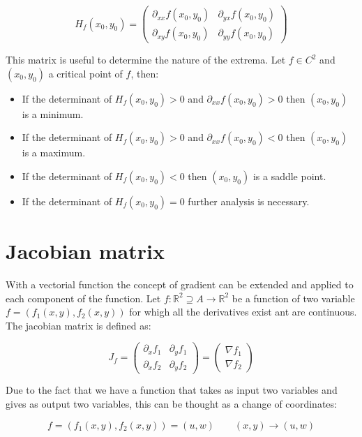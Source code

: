 $$H_f(x_0, y_0) = \begin{pmatrix} \partial_{xx} f(x_0, y_0) & \partial_{yx}f(x_0, y_0) \\ \partial_{xy} f(x_0, y_0) & \partial_{yy}f(x_0, y_0)\end{pmatrix}$$

This matrix is useful to determine the nature of the extrema.
Let $f\in C^2$ and $(x_0, y_0)$ a critical point of $f$, then:

\begin{multicols}{2}
	\begin{itemize}
		\item If the determinant of $H_f(x_0, y_0) >0$ and $\partial_{xx}f(x_0, y_0) > 0$ then $(x_0, y_0)$ is a minimum.
		\item If the determinant of $H_f(x_0, y_0) >0$ and $\partial_{xx}f(x_0, y_0) < 0$ then $(x_0, y_0)$ is a maximum.
		\item If the determinant of $H_f(x_0, y_0)<0$ then $(x_0, y_0)$ is a saddle point.
		\item If the determinant of $H_f(x_0,y_0) = 0$ further analysis is necessary.
	\end{itemize}
\end{multicols}

\section{Jacobian matrix}
With a vectorial function the concept of gradient can be extended and applied to each component of the function.
Let $f:\mathbb{R}^2\supseteq A\rightarrow\mathbb{R}^2$ be a function of two variable $f = (f_1(x, y), f_2(x, y))$ for whigh all the derivatives exist ant are continuous.
The jacobian matrix is defined as:

$$J_f = \begin{pmatrix} \partial_x f_1 & \partial_y f_1\\\partial_x f_2 & \partial_y f_2\end{pmatrix} = \begin{pmatrix} \nabla f_1\\\nabla f_2\end{pmatrix}$$

Due to the fact that we have a function that takes as input two variables and gives as output two variables, this can be thought as a change of coordinates:

$$f = (f_1(x, y), f_2(x, y)) = (u, w)\qquad (x, y)\rightarrow (u, w)$$


